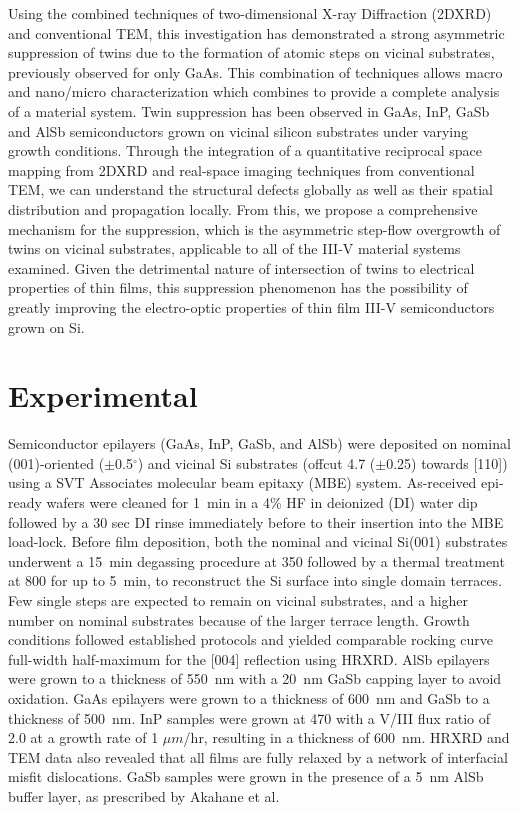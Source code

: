 Using the combined techniques of two-dimensional X-ray Diffraction (2DXRD) and conventional TEM, this investigation has demonstrated a strong asymmetric suppression of twins due to the formation of atomic steps on vicinal substrates, previously observed for only GaAs\cite{Wei1994,Xie1990,Rajkumar1990}.
This combination of techniques allows macro and nano/micro characterization which combines to provide a complete analysis of a material system.
Twin suppression has been observed in GaAs, InP, GaSb and AlSb semiconductors grown on vicinal silicon substrates under varying growth conditions.
Through the integration of a quantitative reciprocal space mapping from 2DXRD and real-space imaging techniques from conventional TEM, we can understand the structural defects globally as well as their spatial distribution and propagation locally.
From this, we propose a comprehensive mechanism for the suppression, which is the asymmetric step-flow overgrowth of twins on vicinal substrates, applicable to all of the III-V material systems examined.
Given the detrimental nature of intersection of twins to electrical properties of thin films, this suppression phenomenon has the possibility of greatly improving the electro-optic properties of thin film III-V semiconductors grown on Si.
\section{Experimental}
Semiconductor epilayers (GaAs, InP, GaSb, and AlSb) were deposited on nominal (001)-oriented (\(\pm\)0.5\(^\circ\)) and vicinal Si substrates (offcut 4.7\degree{} (\(\pm\)0.25\degree) towards [110]) using a SVT Associates molecular beam epitaxy (MBE) system.
As-received epi-ready wafers were cleaned for 1~min in a 4\% HF in deionized (DI) water dip followed by a 30 sec DI rinse immediately before to their insertion into the MBE load-lock.
Before film deposition, both the nominal and vicinal Si(001) substrates underwent a 15~min degassing procedure at 350\celsius{} followed by a thermal treatment at 800\celsius{} for up to 5~min, to reconstruct the Si surface into single domain terraces\cite{NeergaardWaltenburg1995,S1991,Sakamoto1986,Pehlke1991}.
Few single steps are expected to remain on vicinal substrates, and a higher number on nominal substrates because of the larger terrace length.
Growth conditions followed established protocols\cite{Akahane2004,Balakrishnan2006a,Fischer1986} and yielded comparable rocking curve full-width half-maximum for the [004] reflection using HRXRD\@.
AlSb epilayers were grown to a thickness of 550~nm with a 20~nm GaSb capping layer to avoid oxidation.
GaAs epilayers were grown to a thickness of 600~nm and GaSb to a thickness of 500~nm.
InP samples were grown at 470\celsius{} with a V/III flux ratio of 2.0 at a growth rate of 1 \(\mu m\)/hr, resulting in a thickness of 600~nm.
HRXRD and TEM data also revealed that all films are fully relaxed by a network of interfacial misfit dislocations\cite{Vajargah2011}.
GaSb samples were grown in the presence of a 5~nm AlSb buffer layer, as prescribed by Akahane et al.\cite{Akahane2004}

